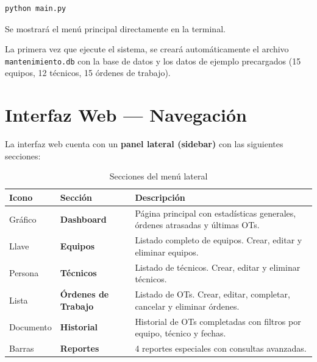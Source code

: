\documentclass[12pt, a4paper]{article}
\begin{document}
\begin{lstlisting}
python main.py
\end{lstlisting}

Se mostrar\'a el men\'u principal directamente en la terminal.

\begin{warnbox}
La primera vez que ejecute el sistema, se crear\'a autom\'aticamente el archivo \texttt{mantenimiento.db} con la base de datos y los datos de ejemplo precargados (15 equipos, 12 t\'ecnicos, 15 \'ordenes de trabajo).
\end{warnbox}

\newpage
\section{Interfaz Web --- Navegaci\'on}

La interfaz web cuenta con un \textbf{panel lateral (sidebar)} con las siguientes secciones:

\begin{table}[H]
    \centering
    \begin{tabularx}{\textwidth}{l l X}
        \toprule
        \textbf{Icono} & \textbf{Secci\'on} & \textbf{Descripci\'on} \\
        \midrule
        Gr\'afico & \textbf{Dashboard} & P\'agina principal con estad\'isticas generales, \'ordenes atrasadas y \'ultimas OTs. \\
        \addlinespace
        Llave & \textbf{Equipos} & Listado completo de equipos. Crear, editar y eliminar equipos. \\
        \addlinespace
        Persona & \textbf{T\'ecnicos} & Listado de t\'ecnicos. Crear, editar y eliminar t\'ecnicos. \\
        \addlinespace
        Lista & \textbf{\'Ordenes de Trabajo} & Listado de OTs. Crear, editar, completar, cancelar y eliminar \'ordenes. \\
        \addlinespace
        Documento & \textbf{Historial} & Historial de OTs completadas con filtros por equipo, t\'ecnico y fechas. \\
        \addlinespace
        Barras & \textbf{Reportes} & 4 reportes especiales con consultas avanzadas. \\
        \bottomrule
    \end{tabularx}
    \caption{Secciones del men\'u lateral}
\end{table}
\end{document}
